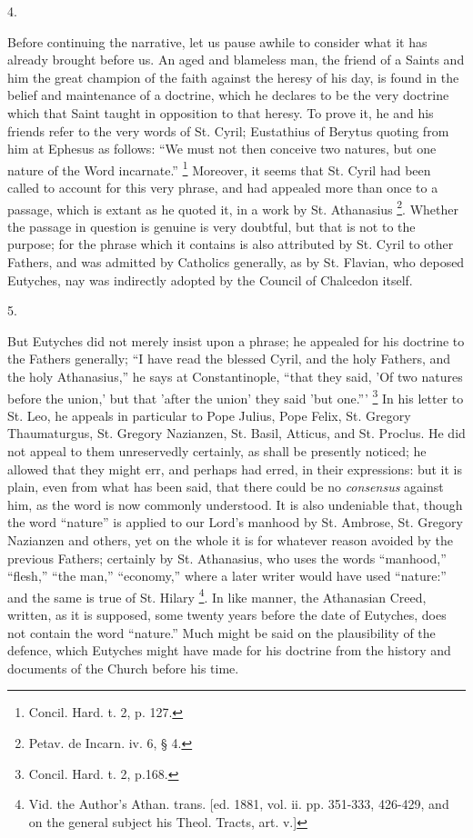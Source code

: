 4.

Before continuing the narrative, let us pause awhile to consider
what it has already brought before us. An aged and blameless man, the
friend of a Saints and him the great champion of the faith against the
heresy of his day, is found in the belief and maintenance of a
doctrine, which he declares to be the very doctrine which that Saint
taught in opposition to that heresy. To prove it, he and his friends
refer to the very words of St. Cyril; Eustathius of Berytus quoting
from him at Ephesus as follows: ``We must not then conceive two
natures, but one nature of the Word incarnate.'' \footnote{Concil. Hard. t. 2, p. 127.} Moreover, it seems that St. Cyril had been called to account
for this very phrase, and had appealed more than once to a passage,
which is extant as he quoted it, in a work by St. Athanasius \footnote{Petav. de Incarn. iv. 6, § 4.}. Whether the passage in question is genuine is very doubtful,
but that is not to the purpose; for the phrase which it contains is
also attributed by St. Cyril to other Fathers, and was admitted by
Catholics generally, as by St. Flavian, who deposed Eutyches, nay was
indirectly adopted by the Council of Chalcedon itself.

5.

But Eutyches did not merely insist upon a phrase; he appealed for
his doctrine to the Fathers generally; ``I have read the blessed
Cyril, and the holy Fathers, and the holy Athanasius,'' he says at
Constantinople, ``that they said, 'Of two natures before the
union,' but that 'after the union' they said 'but one.''' \footnote{Concil. Hard. t. 2, p.168.} In his letter to St. Leo, he appeals in particular to Pope
Julius, Pope Felix, St. Gregory Thaumaturgus, St. Gregory Nazianzen,
St. Basil, Atticus, and St. Proclus. He did not appeal to them
unreservedly certainly, as shall be presently noticed; he allowed that
they might err, and perhaps had erred, in their expressions: but it is
plain, even from what has been said, that there could be no \emph{consensus}
against him, as the word is now commonly understood. It is also
undeniable that, though the word ``nature'' is applied to our
Lord's manhood by St. Ambrose, St. Gregory Nazianzen and others, yet
on the whole it is for whatever reason avoided by the previous
Fathers; certainly by St. Athanasius, who uses the words
``manhood,'' ``flesh,'' ``the man,''
``economy,'' where a later writer would have used
``nature:'' and the same is true of St. Hilary \footnote{Vid. the Author's Athan. trans. [ed. 1881,
vol. ii. pp. 351-333, 426-429, and on the general subject his Theol.
Tracts, art. v.]}. In like manner, the Athanasian Creed, written, as it is
supposed, some twenty years before the date of Eutyches, does not
contain the word ``nature.'' Much might be said on the
plausibility of the defence, which Eutyches might have made for his
doctrine from the history and documents of the Church before his time.

